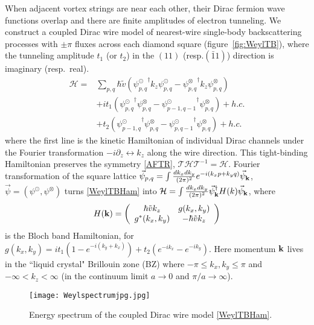 When adjacent vortex strings are near each other, their Dirac fermion wave functions overlap and there are finite amplitudes of electron tunneling. We construct a coupled Dirac wire model of nearest-wire single-body backscattering processes with $\pm\pi$ fluxes across each diamond square (figure~\ref{fig:WeylTB}), where the tunneling amplitude $t_1$ (or $t_2$) in the $(11)$ (resp.$(\bar{1}1)$) direction is imaginary (resp.~real). \begin{align}\mathcal{H}=&\sum_{p,q}\hbar\tilde{v}\left({\psi_{p,q}^\odot}^\dagger k_z\psi_{p,q}^\odot-{\psi_{p,q}^\otimes}^\dagger k_z\psi_{p,q}^\otimes\right)\nonumber\\&+it_1\left({\psi_{p,q}^\odot}^\dagger\psi_{p,q}^\otimes-{\psi_{p-1,q-1}^\odot}^\dagger\psi_{p,q}^\otimes\right)+h.c.\label{WeylTBHam}\\&+t_2\left({\psi_{p-1,q}^\odot}^\dagger\psi_{p,q}^\otimes-{\psi_{p,q-1}^\odot}^\dagger\psi_{p,q}^\otimes\right)+h.c.\nonumber\end{align} where the first line is the kinetic Hamiltonian of individual Dirac channels under the Fourier transformation $-i\partial_z\leftrightarrow k_z$ along the wire direction. This tight-binding Hamiltonian preserves the \AFTR symmetry \eqref{AFTR}, $\mathcal{T}\mathcal{H}\mathcal{T}^{-1}=\mathcal{H}$. Fourier transformation of the square lattice $\vec\psi_{p,q}=\int\frac{dk_xdk_y}{(2\pi)^2}e^{-i(k_xp+k_yq)}\vec\psi_{\bf k}$, $\vec\psi=(\psi^\odot,\psi^\otimes)$ turns \eqref{WeylTBHam} into $\mathcal{H}=\int\frac{dk_xdk_y}{(2\pi)^2}\vec\psi_{\bf k}^\dagger H(k)\vec\psi_{\bf k}$, where \begin{align}H({\bf k})=\left(\begin{array}{*{20}c}\hbar\tilde{v}k_z&g(k_x,k_y)\\g^\ast(k_x,k_y)&-\hbar\tilde{v}k_z\end{array}\right)\label{BlochHam}\end{align} is the Bloch band Hamiltonian, for $g(k_x,k_y)=it_1(1-e^{-i(k_y+k_x)})+t_2(e^{-ik_x}-e^{-ik_y})$. Here momentum ${\bf k}$ lives in the ``liquid crystal" Brillouin zone (\hypertarget{BZ}{BZ}) where $-\pi\leq k_x,k_y\leq\pi$ and $-\infty<k_z<\infty$ (in the continuum limit $a\to0$ and $\pi/a\to\infty$). 

\begin{figure}[htbp]
\centering\texttt{[image: Weylspectrumjpg.jpg]}
\caption{Energy spectrum of the coupled Dirac wire model \eqref{WeylTBHam}.}\label{fig:Weylspectrum}
\end{figure}

